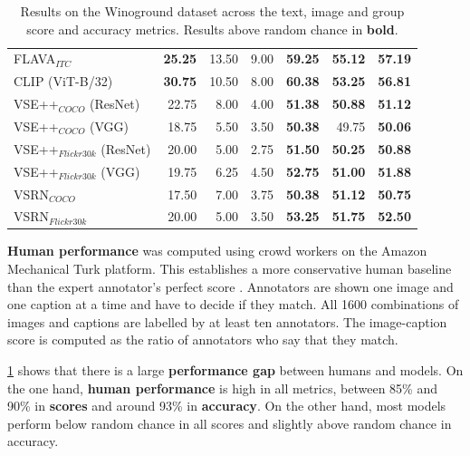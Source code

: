 \begin{table}[ht]
\begin{tabular}{l|rrr|rrr}
 FLAVA$_{ITC}$        & \textbf{25.25} & 13.50          & 9.00           & \textbf{59.25} & \textbf{55.12} & \textbf{57.19} \\
 CLIP (ViT-B/32)              & \textbf{30.75} & 10.50          & 8.00           & \textbf{60.38} & \textbf{53.25} & \textbf{56.81} \\
 VSE++$_{COCO}$ (ResNet)      & 22.75          & 8.00           & 4.00           & \textbf{51.38} & \textbf{50.88} & \textbf{51.12} \\
 VSE++$_{COCO}$ (VGG)         & 18.75          & 5.50           & 3.50           & \textbf{50.38} & 49.75          & \textbf{50.06} \\
 VSE++$_{Flickr30k}$ (ResNet) & 20.00          & 5.00           & 2.75           & \textbf{51.50} & \textbf{50.25} & \textbf{50.88} \\
 VSE++$_{Flickr30k}$ (VGG)    & 19.75          & 6.25           & 4.50           & \textbf{52.75} & \textbf{51.00} & \textbf{51.88} \\
 VSRN$_{COCO}$                & 17.50          & 7.00           & 3.75           & \textbf{50.38} & \textbf{51.12} & \textbf{50.75} \\
 VSRN$_{Flickr30k}$           & 20.00          & 5.00           & 3.50           & \textbf{53.25} & \textbf{51.75} & \textbf{52.50} \\
\bottomrule
\end{tabular}
\caption{Results on the Winoground dataset across the text, image and group score and accuracy metrics. Results above random chance in \textbf{bold}.}
\label{tab:results_aggr_baseline}
\end{table}

\textbf{Human performance} was computed using crowd workers on the Amazon Mechanical Turk platform. This establishes a more conservative human baseline than the expert annotator's perfect score \cite{thrush2022winoground}. Annotators are shown one image and one caption at a time and have to decide if they match. All 1600 combinations of images and captions are labelled by at least ten annotators. The image-caption score is computed as the ratio of annotators who say that they match.

\cref{tab:results_aggr_baseline} shows that there is a large \textbf{performance gap} between humans and models. On the one hand, \textbf{human performance} is high in all metrics, between 85\% and 90\% in \textbf{scores} and around 93\% in \textbf{accuracy}. On the other hand, most models perform below random chance in all scores and slightly above random chance in accuracy.

